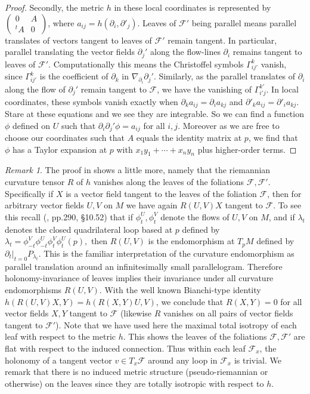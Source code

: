 \documentclass[12pt]{amsart}
\theoremstyle{definition}
\theoremstyle{remark}
\newtheorem{rem}[thm]{Remark}
\newcommand{\sF}{\mathscr{F}}
\newcommand{\del}{\partial}
\begin{document}
\begin{proof}
Secondly, the metric $h$ in these local coordinates is represented by $\begin{pmatrix}0 & A \\ {}^tA & 0 \end{pmatrix}$, where $a_{ij}=h(\del_i, \del'_j)$. Leaves of $\sF'$ being parallel means parallel translates of vectors tangent to leaves of $\sF'$ remain tangent. In particular, parallel translating the vector fields $\del_j'$ along the flow-lines $\del_i$ remains tangent to leaves of $\sF'$. Computationally this means the Christoffel symbols $\Gamma_{ij'}^k$ vanish, since $\Gamma_{ij'}^k$ is the coefficient of $\del_k$ in $\nabla_{\del_i} \del_j'$. Similarly, as the parallel translates of $\del_i$ along the flow of $\del_j'$ remain tangent to $\sF$, we have the vanishing of $\Gamma_{i'j}^{k'}$. In local coordinates, these symbols vanish exactly when $\del_k a_{ij}=\del_i a_{kj}$ and $\del'_k a_{ij}=\del'_i a_{kj}.$ Stare at these equations and we see they are integrable. So we can find a function $\phi$ defined on $U$ such that $\del_i \del_j'\phi =a_{ij}$ for all $i,j$. Moreover as we are free to choose our coordinates such that $A$ equals the identity matrix at $p$, we find that $\phi$ has a Taylor expansion at $p$ with $x_1y_1+\cdots+x_ny_n$ plus higher-order terms.   
\end{proof}



\begin{rem}
The proof in \cite{BBI} shows a little more, namely that the riemannian curvature tensor $R$ of $h$ vanishes along the leaves of the foliations $\sF, \sF'$. Specifically if $X$ is a vector field tangent to the leaves of the foliation $\sF$, then for arbitrary vector fields $U,V$ on $M$ we have again $R(U,V)X$ tangent to $\sF$. To see this recall (\cite{Besse}, pp.290, \S 10.52) that if $\phi^U_t, \phi^V_t$ denote the flows of $U,V$ on $M$, and if $\lambda_t$ denotes the closed quadrilateral loop based at $p$ defined by $\lambda_t=\phi^V_{-t}\phi^U_{-t}\phi^V_t \phi^U_t(p),$ then $R(U,V)$ is the endomorphism at $T_pM$ defined by $\del_t|_{t=0} P_{\lambda_t}.$ This is the familiar interpretation of the curvature endomorphism as parallel translation around an infinitesimally small parallelogram. Therefore holonomy-invariance of leaves implies their invariance under all curvature endomorphisms $R(U,V)$. With the well known Bianchi-type identity $h(R(U,V)X,Y)=h(R(X,Y)U,V)$, we conclude that $R(X,Y)=0$ for all vector fields $X,Y$ tangent to $\sF$ (likewise $R$ vanishes on all pairs of vector fields tangent to $\sF'$). Note that we have used here the maximal total isotropy of each leaf with respect to the metric $h$. This shows the leaves of the foliations $\sF, \sF'$ are flat with respect to the induced connection. Thus within each leaf $\sF_x$, the holonomy of a tangent vector $v\in T_x\sF$ around any loop in $\sF_x$ is trivial. We remark that there is no induced metric structure (pseudo-riemannian or otherwise) on the leaves since they are totally isotropic with respect to $h$. 
\end{rem}
\end{document}
